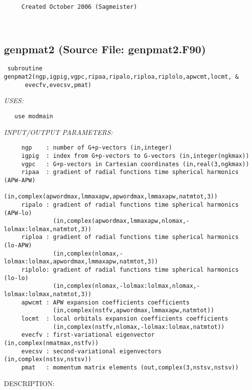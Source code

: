 \documentclass[11pt]{article}
\begin{document}
\begin{verbatim}     Created October 2006 (Sagmeister)\end{verbatim}






 
 
\mbox{}\hrulefill\ 
 
\subsection{genpmat2 (Source File: genpmat2.F90)}


\begin{verbatim} subroutine genpmat2(ngp,igpig,vgpc,ripaa,ripalo,riploa,riplolo,apwcmt,locmt, &
      evecfv,evecsv,pmat)\end{verbatim}{\em USES:}
\begin{verbatim}   use modmain\end{verbatim}{\em INPUT/OUTPUT PARAMETERS:}
\begin{verbatim}     ngp    : number of G+p-vectors (in,integer)
     igpig  : index from G+p-vectors to G-vectors (in,integer(ngkmax))
     vgpc   : G+p-vectors in Cartesian coordinates (in,real(3,ngkmax))
     ripaa  : gradient of radial functions time spherical harmonics (APW-APW)
              (in,complex(apwordmax,lmmaxapw,apwordmax,lmmaxapw,natmtot,3))
     ripalo : gradient of radial functions time spherical harmonics (APW-lo)
              (in,complex(apwordmax,lmmaxapw,nlomax,-lolmax:lolmax,natmtot,3))
     riploa : gradient of radial functions time spherical harmonics (lo-APW)
              (in,complex(nlomax,-lolmax:lolmax,apwordmax,lmmaxapw,natmtot,3))
     riplolo: gradient of radial functions time spherical harmonics (lo-lo)
              (in,complex(nlomax,-lolmax:lolmax,nlomax,-lolmax:lolmax,natmtot,3))
     apwcmt : APW expansion coefficients coefficients
              (in,complex(nstfv,apwordmax,lmmaxapw,natmtot))
     locmt  : local orbitals expansion coefficients coefficients
              (in,complex(nstfv,nlomax,-lolmax:lolmax,natmtot))
     evecfv : first-variational eigenvector (in,complex(nmatmax,nstfv))
     evecsv : second-variational eigenvectors (in,complex(nstsv,nstsv))
     pmat   : momentum matrix elements (out,complex(3,nstsv,nstsv))\end{verbatim}
{\sf DESCRIPTION:\\ }
\end{document}
